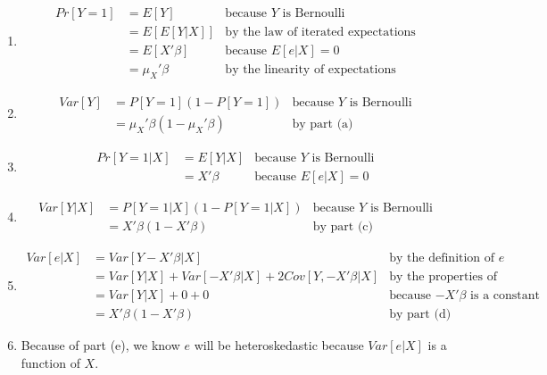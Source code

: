\documentclass[10pt]{article}
\newenvironment{problem}[2][Problem]{\begin{trivlist}
\item[\hskip \labelsep {\bfseries #1}\hskip \labelsep {\bfseries #2.}]}{\end{trivlist}}
\begin{document}
\begin{problem}{3}
    \hfill
    \begin{enumerate}[label=(\alph*)]
        \item \hfill
            \begin{align*}
                Pr[Y = 1] &= E[Y] & \text{because $Y$ is Bernoulli} \\
                          &= E[E[Y | X]] & \text{by the law of iterated expectations} \\
                          &= E[X'\beta] & \text{because $E[e | X] = 0$} \\
                          &= \mu_X'\beta & \text{by the linearity of expectations}
            \end{align*}
        \item \hfill
            \begin{align*}
                Var[Y] &= P[Y=1](1 - P[Y=1]) & \text{because $Y$ is Bernoulli} \\
                       &= \mu_X'\beta(1 - \mu_X'\beta) & \text{by part (a)}
            \end{align*}
        \item \hfill
            \begin{align*}
                Pr[Y = 1 | X] &= E[Y | X] & \text{because $Y$ is Bernoulli} \\
                              &= X'\beta & \text{because $E[e | X] = 0$}
            \end{align*}
        \item \hfill
            \begin{align*}
                Var[Y | X] &= P[Y=1|X](1 - P[Y=1|X]) & \text{because $Y$ is Bernoulli} \\
                           &= X'\beta(1 - X'\beta) & \text{by part (c)}
            \end{align*}
        \item \hfill
            \begin{align*}
                Var[e | X] &= Var[Y - X'\beta | X] & \text{by the definition of $e$} \\
                           &= Var[Y | X] + Var[-X'\beta | X] + 2Cov[Y, -X'\beta | X] & \text{by the properties of variance} \\
                           &= Var[Y | X] + 0 + 0 & \text{because $-X'\beta$ is a constant} \\
                           &= X'\beta(1 - X'\beta) & \text{by part (d)}
            \end{align*}
        \item 
            Because of part (e), we know $e$ will be heteroskedastic because $Var[e | X]$ is a function of $X$.

    \end{enumerate}
\end{problem}
\end{document}
